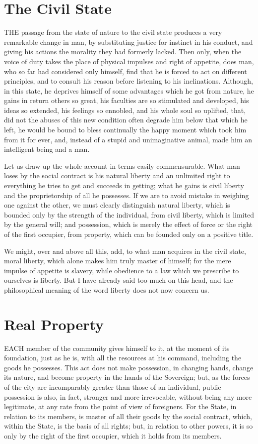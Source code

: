 \documentclass[12pt]{report}
\begin{document}
\section{The Civil State}
THE passage from the state of nature to the civil state produces a very remarkable change in man, by substituting justice for instinct in his conduct, and giving his actions the morality they had formerly lacked. Then only, when the voice of duty takes the place of physical impulses and right of appetite, does man, who so far had considered only himself, find that he is forced to act on different principles, and to consult his reason before listening to his inclinations. Although, in this state, he deprives himself of some advantages which he got from nature, he gains in return others so great, his faculties are so stimulated and developed, his ideas so extended, his feelings so ennobled, and his whole soul so uplifted, that, did not the abuses of this new condition often degrade him below that which he left, he would be bound to bless continually the happy moment which took him from it for ever, and, instead of a stupid and unimaginative animal, made him an intelligent being and a man.

Let us draw up the whole account in terms easily commensurable. What man loses by the social contract is his natural liberty and an unlimited right to everything he tries to get and succeeds in getting; what he gains is civil liberty and the proprietorship of all he possesses. If we are to avoid mistake in weighing one against the other, we must clearly distinguish natural liberty, which is bounded only by the strength of the individual, from civil liberty, which is limited by the general will; and possession, which is merely the effect of force or the right of the first occupier, from property, which can be founded only on a positive title.

We might, over and above all this, add, to what man acquires in the civil state, moral liberty, which alone makes him truly master of himself; for the mere impulse of appetite is slavery, while obedience to a law which we prescribe to ourselves is liberty. But I have already said too much on this head, and the philosophical meaning of the word liberty does not now concern us.
\clearpage
\section{Real Property}
EACH member of the community gives himself to it, at the moment of its foundation, just as he is, with all the resources at his command, including the goods he possesses. This act does not make possession, in changing hands, change its nature, and become property in the hands of the Sovereign; but, as the forces of the city are incomparably greater than those of an individual, public possession is also, in fact, stronger and more irrevocable, without being any more legitimate, at any rate from the point of view of foreigners. For the State, in relation to its members, is master of all their goods by the social contract, which, within the State, is the basis of all rights; but, in relation to other powers, it is so only by the right of the first occupier, which it holds from its members.
\end{document}
